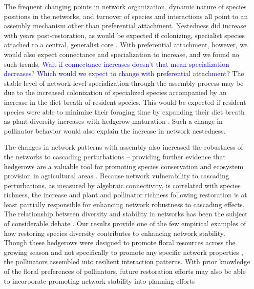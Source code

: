 \documentclass[12pt]{article}
\newcommand{\flagged}[1] {
  \textcolor{blue}{#1}
}
\begin{document}
The frequent changing points in network organization, dynamic nature
of species positions in the networks, and turnover of species and
interactions all point to an assembly mechanism other than
preferential attachment. Nestedness did increase with years
post-restoration, as would be expected if colonizing, specialist
species attached to a central, generalist core
\citep{albrecht2010plant}. With preferential attachment, however, we
would also expect connectance and specialization to increase, and we
found no such trends. \flagged{Wait if connectance increases doesn't
  that mean specialization decreases? Which would we expect to change
  with preferential attachment?} The stable level of network-level
specialization through the assembly process may be due to the
increased colonization of specialized species \citep{mgonigle-2015-x}
accompanied by an increase in the diet breath of resident
species. This would be expected if resident species were able to
minimize their foraging time by expanding their diet breath as plant
diversity increases with hedgerow maturation \citep{Waser1996,
  pyke1984optimal, Bluthgen2007, albrecht2010plant}. Such a change in
pollinator behavior would also explain the increase in network
nestedness.

The changes in network patterns with assembly also increased the
robustness of the networks to cascading perturbations -- providing
further evidence that hedgerows are a valuable tool for promoting
species conservation and ecosystem provision in agricultural areas
\citep{mgonigle-2015-x, ponisio2015farm, kremen-2015-602}. Because
network vulnerability to cascading perturbations, as measured by
algebraic connectivity, is correlated with species richness, the
increase and plant and pollinator richness following restoration is at
least partially responsible for enhancing network robustness to
cascading effects. The relationship between diversity and stability in
networks has been the subject of considerable debate
\citep[e.g.,][]{may1972will, pimm1984complexity,
  montoya2006ecological}. Our results provide one of the few empirical
examples of how restoring species diversity contributes to enhancing
network stability. Though these hedgerows were designed to promote
floral resources across the growing season and not specifically to
promote any specific network properties \citep{menz-2010-4}, the
pollinators assembled into resilient interaction patterns. With prior
knowledge of the floral preferences of pollinators, future restoration
efforts may also be able to incorporate promoting network stability
into planning efforts \citep{mgonigle2016tool}
\end{document}
